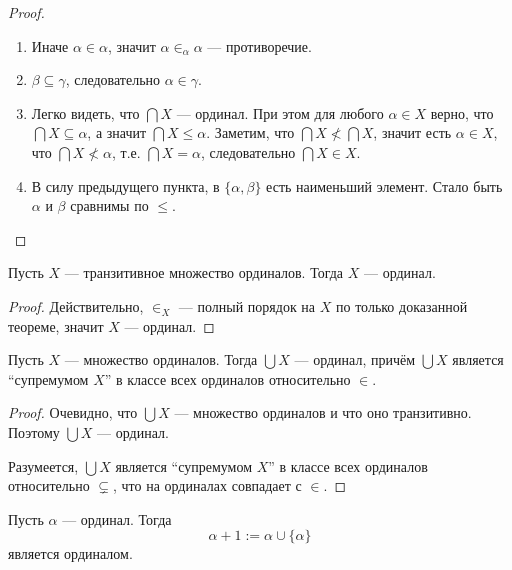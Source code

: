 \documentclass[12pt,a4paper]{article}
\begin{document}
    \begin{proof}
        \begin{enumerate}
            \item Иначе $\alpha \in \alpha$, значит $\alpha \in_\alpha \alpha$ --- противоречие.
            \item $\beta \subseteq \gamma$, следовательно $\alpha \in \gamma$.
            \setcounter{enumi}{3}
            \item Легко видеть, что $\bigcap X$ --- ординал. При этом для любого $\alpha \in X$ верно, что $\bigcap X \subseteq \alpha$, а значит $\bigcap X \leqslant \alpha$. Заметим, что $\bigcap X \nless \bigcap X$, значит есть $\alpha \in X$, что $\bigcap X \nless \alpha$, т.е. $\bigcap X = \alpha$, следовательно $\bigcap X \in X$.
            \setcounter{enumi}{2}
            \item В силу предыдущего пункта, в $\{\alpha, \beta\}$ есть наименьший элемент. Стало быть $\alpha$ и $\beta$ сравнимы по $\leqslant$.
        \end{enumerate}
    \end{proof}

    \begin{corollary}
        Пусть $X$ --- транзитивное множество ординалов. Тогда $X$ --- ординал.
    \end{corollary}

    \begin{proof}
        Действительно, $\in_X$ --- полный порядок на $X$ по только доказанной теореме, значит $X$ --- ординал.
    \end{proof}

    \begin{theorem}
        Пусть $X$ --- множество ординалов. Тогда $\bigcup X$ --- ординал, причём $\bigcup X$ является ``супремумом $X$'' в классе всех ординалов относительно $\in$.
    \end{theorem}

    \begin{proof}
        Очевидно, что $\bigcup X$ --- множество ординалов и что оно транзитивно. Поэтому $\bigcup X$ --- ординал.

        Разумеется, $\bigcup X$ является ``супремумом $X$'' в классе всех ординалов относительно $\subsetneq$, что на ординалах совпадает с $\in$.
    \end{proof}

    \begin{definition}
        Пусть $\alpha$ --- ординал. Тогда
        \[\alpha + 1 := \alpha \cup \{\alpha\}\]
        является ординалом.
    \end{definition}
\end{document}
